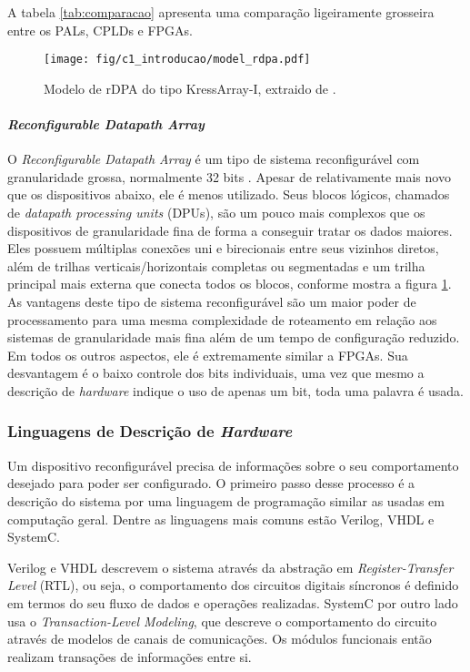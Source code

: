 \documentclass[11pt,a4paper,oneside]{book}
\begin{document}
A tabela \ref{tab:comparacao} apresenta uma compara\c{c}\~ao ligeiramente grosseira entre os PALs, CPLDs e FPGAs.

\begin{figure}[h]
\centering
\texttt{[image: fig/c1\_introducao/model\_rdpa.pdf]}
\caption{Modelo de rDPA do tipo KressArray-I, extraido de \cite{Hartenstein1995}.}
\label{fig:kressarray}
\end{figure}

\paragraph{\textit{Reconfigurable Datapath Array}}
O \textit{Reconfigurable Datapath Array} \'e um tipo de sistema reconfigur\'avel com granularidade grossa, normalmente 32 bits \cite{Hartenstein2001}.
Apesar de relativamente mais novo que os dispositivos abaixo, ele \'e menos utilizado.
Seus blocos l\'ogicos, chamados de \textit{datapath processing units} (DPUs), s\~ao um pouco mais complexos que os dispositivos de granularidade fina de forma a conseguir tratar os dados maiores.
Eles possuem m\'ultiplas conex\~oes uni e birecionais entre seus vizinhos diretos, al\'em de trilhas verticais/horizontais completas ou segmentadas e um trilha principal mais externa que conecta todos os blocos, conforme mostra a figura \ref{fig:kressarray}.
As vantagens deste tipo de sistema reconfigur\'avel s\~ao um maior poder de processamento para uma mesma complexidade de roteamento em rela\c{c}\~ao aos sistemas de granularidade mais fina al\'em de um tempo de configura\c{c}\~ao reduzido.
Em todos os outros aspectos, ele \'e extremamente similar a FPGAs.
Sua desvantagem \'e o baixo controle dos bits individuais, uma vez que mesmo a descri\c{c}\~ao de \textit{hardware} indique o uso de apenas um bit, toda uma palavra \'e usada.

\subsubsection{Linguagens de Descri\c{c}\~ao de \textit{Hardware}}
Um dispositivo reconfigur\'avel precisa de informa\c{c}\~oes sobre o seu comportamento desejado para poder ser configurado.
O primeiro passo desse processo \'e a descri\c{c}\~ao do sistema por uma linguagem de programa\c{c}\~ao similar as usadas em computa\c{c}\~ao geral.
Dentre as linguagens mais comuns est\~ao Verilog, VHDL e SystemC.

Verilog e VHDL descrevem o sistema atrav\'es da abstra\c{c}\~ao em \textit{Register-Transfer Level} (RTL), ou seja, o comportamento dos circuitos digitais s\'i­ncronos \'e definido em termos do seu fluxo de dados e opera\c{c}\~oes realizadas.
SystemC por outro lado usa o \textit{Transaction-Level Modeling}, que descreve o comportamento do circuito atrav\'es de modelos de canais de comunica\c{c}\~oes.
Os m\'odulos funcionais ent\~ao realizam transa\c{c}\~oes de informa\c{c}\~oes entre si.
\end{document}
